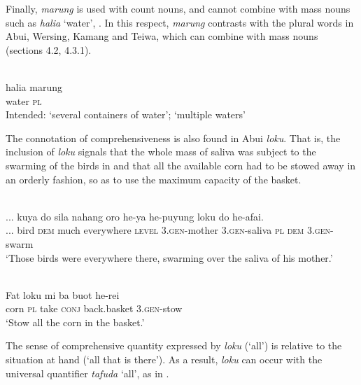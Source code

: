 Finally, \textit{marung} is used with count nouns, and cannot combine with mass nouns such as \textit{halia} `water', . In this respect, \textit{marung} contrasts with the plural words in Abui, Wersing, Kamang and Teiwa, which can combine with mass nouns (sections 4.2,  4.3.1).


\ea%
\label{ex:9:68}
 \\
\gll  *halia marung \\
   water \textsc{pl}  \\
\glt Intended: `several containers of water';  `multiple waters'
\z






The connotation of comprehensiveness is also found in Abui \textit{loku}. That is, the inclusion of \textit{loku} signals that the whole mass of saliva was subject to the swarming of the birds in  and that all the available corn had to be stowed away  in an orderly fashion, so as to use the maximum capacity of the basket.


\ea%
\label{ex:9:69}
 \\
\gll  ... {kuya} do sila nahang oro  he-ya he-puyung loku do he-afai. \\
   ...  bird \textsc{dem} much everywhere \textsc{level}   \textsc{3.gen}-mother \textsc{3.gen-}saliva \textsc{pl} \textsc{dem} \textsc{3.gen-}swarm \\
\glt `Those birds were everywhere there, swarming over the saliva of his mother.'
\z













\ea%
\label{ex:9:70}
 \\
\gll  Fat loku mi ba buot he-rei \\
    corn \textsc{pl} take \textsc{conj} back.basket \textsc{3.gen-}stow \\
\glt `Stow all the corn in the basket.'
\z






The sense of comprehensive quantity expressed by \textit{loku} (`all') is relative to the situation at hand (`all that is there'). As a result, \textit{loku} can occur with the universal quantifier \textit{tafuda} `all', as in .



